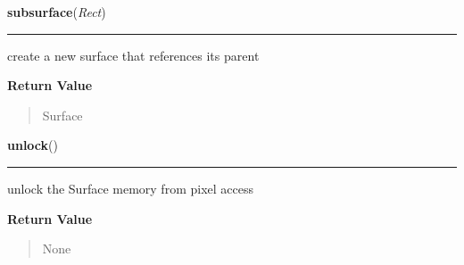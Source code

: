     \label{pygame:Surface:subsurface}

    \vspace{0.5ex}

\hspace{.8\funcindent}\begin{boxedminipage}{\funcwidth}

    \raggedright \textbf{subsurface}(\textit{Rect})

    \vspace{-1.5ex}

    \rule{\textwidth}{0.5\fboxrule}
\setlength{\parskip}{2ex}
    create a new surface that references its parent

\setlength{\parskip}{1ex}
      \textbf{Return Value}
    \vspace{-1ex}

      \begin{quote}
      Surface

      \end{quote}

    \end{boxedminipage}

    \label{pygame:Surface:unlock}

    \vspace{0.5ex}

\hspace{.8\funcindent}\begin{boxedminipage}{\funcwidth}

    \raggedright \textbf{unlock}()

    \vspace{-1.5ex}

    \rule{\textwidth}{0.5\fboxrule}
\setlength{\parskip}{2ex}
    unlock the Surface memory from pixel access

\setlength{\parskip}{1ex}
      \textbf{Return Value}
    \vspace{-1ex}

      \begin{quote}
      None

      \end{quote}

    \end{boxedminipage}

    \label{pygame:Surface:unmap_rgb}

    \vspace{0.5ex}

